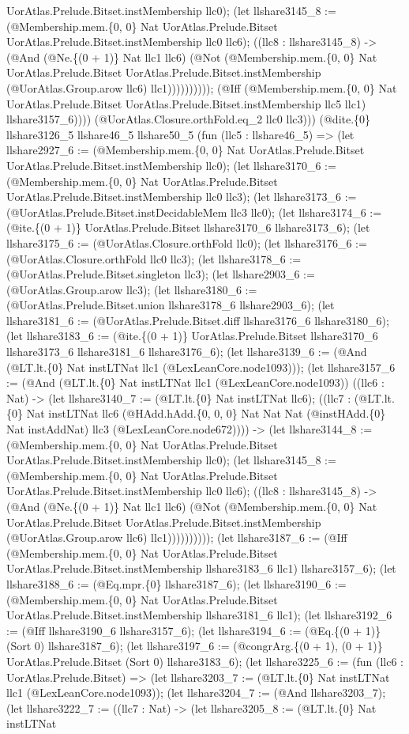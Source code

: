 \documentclass[11pt]{article}
\begin{document}
UorAtlas.Prelude.Bitset.instMembership llc0); (let llshare3145\_8 := (@Membership.mem.\{0, 0\} Nat UorAtlas.Prelude.Bitset UorAtlas.Prelude.Bitset.instMembership llc0 llc6); ((llc8 : llshare3145\_8) -> (@And (@Ne.\{(0 + 1)\} Nat llc1 llc6) (@Not (@Membership.mem.\{0, 0\} Nat UorAtlas.Prelude.Bitset UorAtlas.Prelude.Bitset.instMembership (@UorAtlas.Group.arow llc6) llc1)))))))))); (@Iff (@Membership.mem.\{0, 0\} Nat UorAtlas.Prelude.Bitset UorAtlas.Prelude.Bitset.instMembership llc5 llc1) llshare3157\_6)))) (@UorAtlas.Closure.orthFold.eq\_2 llc0 llc3))) (@dite.\{0\} llshare3126\_5 llshare46\_5 llshare50\_5 (fun (llc5 : llshare46\_5) => (let llshare2927\_6 := (@Membership.mem.\{0, 0\} Nat UorAtlas.Prelude.Bitset UorAtlas.Prelude.Bitset.instMembership llc0); (let llshare3170\_6 := (@Membership.mem.\{0, 0\} Nat UorAtlas.Prelude.Bitset UorAtlas.Prelude.Bitset.instMembership llc0 llc3); (let llshare3173\_6 := (@UorAtlas.Prelude.Bitset.instDecidableMem llc3 llc0); (let llshare3174\_6 := (@ite.\{(0 + 1)\} UorAtlas.Prelude.Bitset llshare3170\_6 llshare3173\_6); (let llshare3175\_6 := (@UorAtlas.Closure.orthFold llc0); (let llshare3176\_6 := (@UorAtlas.Closure.orthFold llc0 llc3); (let llshare3178\_6 := (@UorAtlas.Prelude.Bitset.singleton llc3); (let llshare2903\_6 := (@UorAtlas.Group.arow llc3); (let llshare3180\_6 := (@UorAtlas.Prelude.Bitset.union llshare3178\_6 llshare2903\_6); (let llshare3181\_6 := (@UorAtlas.Prelude.Bitset.diff llshare3176\_6 llshare3180\_6); (let llshare3183\_6 := (@ite.\{(0 + 1)\} UorAtlas.Prelude.Bitset llshare3170\_6 llshare3173\_6 llshare3181\_6 llshare3176\_6); (let llshare3139\_6 := (@And (@LT.lt.\{0\} Nat instLTNat llc1 (@LexLeanCore.node1093))); (let llshare3157\_6 := (@And (@LT.lt.\{0\} Nat instLTNat llc1 (@LexLeanCore.node1093)) ((llc6 : Nat) -> (let llshare3140\_7 := (@LT.lt.\{0\} Nat instLTNat llc6); ((llc7 : (@LT.lt.\{0\} Nat instLTNat llc6 (@HAdd.hAdd.\{0, 0, 0\} Nat Nat Nat (@instHAdd.\{0\} Nat instAddNat) llc3 (@LexLeanCore.node672)))) -> (let llshare3144\_8 := (@Membership.mem.\{0, 0\} Nat UorAtlas.Prelude.Bitset UorAtlas.Prelude.Bitset.instMembership llc0); (let llshare3145\_8 := (@Membership.mem.\{0, 0\} Nat UorAtlas.Prelude.Bitset UorAtlas.Prelude.Bitset.instMembership llc0 llc6); ((llc8 : llshare3145\_8) -> (@And (@Ne.\{(0 + 1)\} Nat llc1 llc6) (@Not (@Membership.mem.\{0, 0\} Nat UorAtlas.Prelude.Bitset UorAtlas.Prelude.Bitset.instMembership (@UorAtlas.Group.arow llc6) llc1)))))))))); (let llshare3187\_6 := (@Iff (@Membership.mem.\{0, 0\} Nat UorAtlas.Prelude.Bitset UorAtlas.Prelude.Bitset.instMembership llshare3183\_6 llc1) llshare3157\_6); (let llshare3188\_6 := (@Eq.mpr.\{0\} llshare3187\_6); (let llshare3190\_6 := (@Membership.mem.\{0, 0\} Nat UorAtlas.Prelude.Bitset UorAtlas.Prelude.Bitset.instMembership llshare3181\_6 llc1); (let llshare3192\_6 := (@Iff llshare3190\_6 llshare3157\_6); (let llshare3194\_6 := (@Eq.\{(0 + 1)\} (Sort 0) llshare3187\_6); (let llshare3197\_6 := (@congrArg.\{(0 + 1), (0 + 1)\} UorAtlas.Prelude.Bitset (Sort 0) llshare3183\_6); (let llshare3225\_6 := (fun (llc6 : UorAtlas.Prelude.Bitset) => (let llshare3203\_7 := (@LT.lt.\{0\} Nat instLTNat llc1 (@LexLeanCore.node1093)); (let llshare3204\_7 := (@And llshare3203\_7); (let llshare3222\_7 := ((llc7 : Nat) -> (let llshare3205\_8 := (@LT.lt.\{0\} Nat instLTNat 
\end{document}
